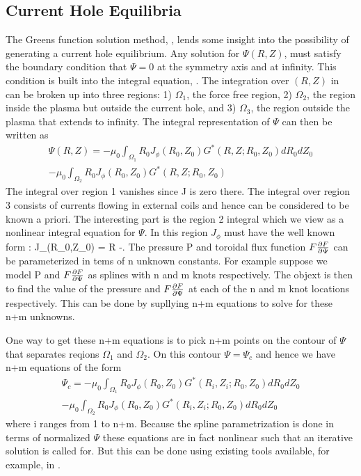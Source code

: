 \subsection{Current Hole Equilibria}

The Greens function solution method, , lends some insight into the
possibility of generating a current hole equilibrium. Any solution for
$\Psi(R,Z)$, must satisfy the boundary condition that $\Psi =0 $ at the symmetry
axis and at infinity. This condition is built into the integral equation,
. The integration over $(R,Z)$ in  can be broken up
into three regions: 1) $\Omega_1$, the force free region, 2) $\Omega_2$, the
region inside the plasma but outside the current hole, and 3) $\Omega_3$, the
region outside the plasma that extends to infinity. The integral representation
of $\Psi$ can then be written as  
\begin{multline}
 \Psi(R,Z)=-\mu_0\int_{\Omega_1} R_0J_\phi(R_0,Z_0)G^*(R,Z;R_0,Z_0)dR_0dZ_0 \\
           -\mu_0\int_{\Omega_2} R_0J_\phi(R_0,Z_0)G^*(R,Z;R_0,Z_0)
\end{multline}
The integral over region 1 vanishes since J is zero there. The integral over
region 3 consists of currents flowing in external coils and hence can be
considered to be known a priori. The interesting part is the region 2 integral
which we view as a nonlinear integral equation for $\Psi$. In this region 
$J_\phi $ must have the well known form :
\beq
 J_\phi(R_0,Z_0) = R -.
\eeq
The pressure P and toroidal flux function $F\frac{\partial{ F}}{\partial{ \Psi}} $ can be
parameterized in tems of n unknown constants. For example suppose we model P and
$F\frac{\partial{ F}}{\partial{ \Psi}} $ as splines with n and m knots respectively. The objext is
then to find the value of the pressure and $F\frac{\partial{ F}}{\partial{ \Psi}} $ at each of the n
and m knot locations respectively. This can be done by supllying n+m equations
to solve for these n+m unknowns.

One way to get these n+m equations is to pick n+m points on the contour of
$\Psi$ that separates reqions $\Omega_1$ and $\Omega_2$. On this contour $ \Psi
= \Psi_c $ and hence we have n+m equations of the form
\begin{multline}
 \Psi_c =-\mu_0\int_{\Omega_1} R_0J_\phi(R_0,Z_0)G^*(R_i,Z_i;R_0,Z_0)dR_0dZ_0\\ 
         -\mu_0\int_{\Omega_2} R_0J_\phi(R_0,Z_0)G^*(R_i,Z_i;R_0,Z_0)dR_0dZ_0
\end{multline}
where i ranges from 1 to n+m.
Because the spline parametrization is done  in terms of
normalized $\Psi $ these equations are in fact nonlinear such that 
an iterative solution is called for. But this can be done
using existing tools available, for example, in \ot.

